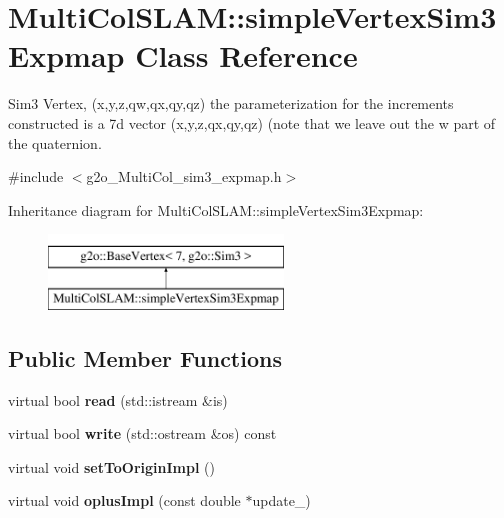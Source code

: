 \hypertarget{classMultiColSLAM_1_1simpleVertexSim3Expmap}{}\section{Multi\+Col\+S\+L\+AM\+:\+:simple\+Vertex\+Sim3\+Expmap Class Reference}
\label{classMultiColSLAM_1_1simpleVertexSim3Expmap}


Sim3 Vertex, (x,y,z,qw,qx,qy,qz) the parameterization for the increments constructed is a 7d vector (x,y,z,qx,qy,qz) (note that we leave out the w part of the quaternion.  




{\ttfamily \#include $<$g2o\+\_\+\+Multi\+Col\+\_\+sim3\+\_\+expmap.\+h$>$}

Inheritance diagram for Multi\+Col\+S\+L\+AM\+:\+:simple\+Vertex\+Sim3\+Expmap\+:\begin{figure}[H]
\begin{center}
\leavevmode
\includegraphics[height=2.000000cm]{classMultiColSLAM_1_1simpleVertexSim3Expmap}
\end{center}
\end{figure}
\subsection*{Public Member Functions}
\begin{DoxyCompactItemize}
\item 
virtual bool {\bfseries read} (std\+::istream \&is)\hypertarget{classMultiColSLAM_1_1simpleVertexSim3Expmap_a3aff42bc51c930ab46c597dbc1a27f17}{}\label{classMultiColSLAM_1_1simpleVertexSim3Expmap_a3aff42bc51c930ab46c597dbc1a27f17}

\item 
virtual bool {\bfseries write} (std\+::ostream \&os) const \hypertarget{classMultiColSLAM_1_1simpleVertexSim3Expmap_abb9068ae32fa75b2deebd35702b800ce}{}\label{classMultiColSLAM_1_1simpleVertexSim3Expmap_abb9068ae32fa75b2deebd35702b800ce}

\item 
virtual void {\bfseries set\+To\+Origin\+Impl} ()\hypertarget{classMultiColSLAM_1_1simpleVertexSim3Expmap_a1f2228bd267ebb9b47d21f981fcb6101}{}\label{classMultiColSLAM_1_1simpleVertexSim3Expmap_a1f2228bd267ebb9b47d21f981fcb6101}

\item 
virtual void {\bfseries oplus\+Impl} (const double $\ast$update\+\_\+)\hypertarget{classMultiColSLAM_1_1simpleVertexSim3Expmap_aaa78cb919385479caf5e1face579e0a3}{}\label{classMultiColSLAM_1_1simpleVertexSim3Expmap_aaa78cb919385479caf5e1face579e0a3}

\end{DoxyCompactItemize}
